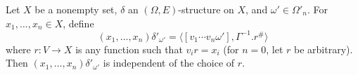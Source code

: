 Let $X$ be a nonempty set, $\delta$ an $(\Omega, E)$-structure on $X$, and $\omega' \in \Omega'_n$. For $x_1, \ldots, x_n \in X$, define
$$
(x_1, \ldots, x_n) \delta'_{\omega'} = \langle [v_1 \cdots v_n \omega'], \Gamma^{-1}.r^{\#} \rangle
$$
where $r: V \longrightarrow X$ is any function such that $v_i r = x_i$ (for $n=0$, let $r$ be arbitrary). Then $(x_1, \ldots, x_n) \delta'_{\omega'}$ is independent of the choice of $r$.
